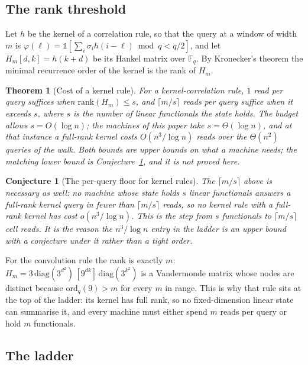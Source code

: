 \documentclass[11pt]{article}
\newtheorem{theorem}{Theorem}
\newtheorem{conjecture}{Conjecture}
\theoremstyle{remark}
\begin{document}
\subsection{The rank threshold}\label{sec:kernel}

Let $h$ be the kernel of a correlation rule, so that the query at a window of width $m$ is
$\varphi(\ell)=\mathbb 1[\sum_{i}\sigma_{i}h(i-\ell)\bmod q<q/2]$, and let $H_{m}[d,k]=h(k+d)$ be
its Hankel matrix over $\mathbb F_{q}$. By Kronecker's theorem the minimal recurrence order of the
kernel is the rank of $H_{m}$.

\begin{theorem}[Cost of a kernel rule]\label{thm:rank}
For a kernel-correlation rule, $1$ read per query suffices when $\mathrm{rank}(H_{m})\le s$, and
$\lceil m/s\rceil$ reads per query suffice when it exceeds $s$, where $s$ is the number of linear
functionals the state holds. The budget allows $s=O(\log n)$; the machines of this paper take
$s=\Theta(\log n)$, and at that instance a full-rank kernel costs $O(n^{3}/\log n)$ reads over the
$\Theta(n^{2})$ queries of the walk. Both bounds are upper bounds on what a machine needs; the
matching lower bound is Conjecture~\ref{conj:kernel-floor}, and it is not proved here.
\end{theorem}

\begin{conjecture}[The per-query floor for kernel rules]\label{conj:kernel-floor}
The $\lceil m/s\rceil$ above is necessary as well: no machine whose state holds $s$ linear functionals
answers a full-rank kernel query in fewer than $\lceil m/s\rceil$ reads, so no kernel rule with a
full-rank kernel has cost $o(n^{3}/\log n)$. This is the step from $s$ functionals to $\lceil m/s\rceil$
cell reads. It is the reason the $n^{3}/\log n$ entry in the ladder is an upper bound with a conjecture
under it rather than a tight order.
\end{conjecture}

For the convolution rule the rank is exactly $m$:
$H_{m}=3\,\mathrm{diag}(3^{d^{2}})\,[9^{dk}]\,\mathrm{diag}(3^{k^{2}})$ is a Vandermonde matrix
whose nodes are distinct because $\mathrm{ord}_{q}(9)>m$ for every $m$ in range. This is why that
rule sits at the top of the ladder: its kernel has full rank, so no fixed-dimension linear state can
summarise it, and every machine must either spend $m$ reads per query or hold $m$ functionals.

\subsection{The ladder}\label{sec:ladder}
\end{document}
